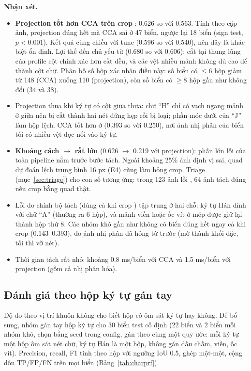 \textbf{Nhận xét.}
\begin{itemize}
  \item \textbf{Projection tốt hơn CCA trên crop }: 0.626 so với 0.563. Tính theo cặp ảnh, projection đúng hết mà CCA sai ở 47 biển, ngược lại 18 biển (sign test, $p<0.001$). Kết quả cùng chiều với tune (0.596 so với 0.540), nên đây là khác biệt ổn định. Lợi thế đến chủ yếu từ  (0.680 so với 0.606): cắt tại thung lũng của profile cột chính xác hơn cắt đều, và các vệt nhiễu mảnh không đủ cao để thành cột chữ. Phân bố số hộp xác nhận điều này: số biển có $\le 6$ hộp giảm từ 148 (CCA) xuống 110 (projection), còn số biển có $\ge 8$ hộp gần như không đổi (34 và 38).
  \item Projection thua khi ký tự có cột giữa thưa: chữ ``H'' chỉ có vạch ngang mảnh ở giữa nên bị cắt thành hai nét đứng hẹp rồi bị loại; phần móc dưới của ``J'' làm hộp lệch. CCA tốt hơn ở  (0.393 so với 0.250), nơi ảnh nhị phân của biển tối có nhiều vệt dọc nối vào ký tự.
  \item \textbf{Khoảng cách  $\to$  rất lớn} (0.626 $\to$ 0.219 với projection): phần lớn lỗi của toàn pipeline nằm trước bước tách. Ngoài khoảng 25\% ảnh định vị sai, quad dự đoán lệch trung bình 16 px (E4) cũng làm hỏng crop. Triage (mục~\ref{sec:triage}) cho con số tương ứng: trong 123 ảnh lỗi , 64 ảnh tách đúng nếu crop bằng quad thật.
  \item Lỗi do chính bộ tách (đúng cả khi crop ) tập trung ở hai chỗ: ký tự Hán dính với chữ ``A'' (thường ra 6 hộp), và mảnh viền hoặc ốc vít ở mép được giữ lại thành hộp thứ 8. Các nhóm khó gần như không có biển đúng hết ngay cả khi crop  (0.143--0.393), do ảnh nhị phân đã hỏng từ trước (mờ thành khối đặc, tối thì vỡ nét).
  \item Thời gian tách rất nhỏ: khoảng 0.8 ms/biển với CCA và 1.5 ms/biển với projection (gồm cả nhị phân hóa).
\end{itemize}

\subsection{Đánh giá theo hộp ký tự gán tay}
\label{sec:charbox}

Độ đo theo vị trí khuôn không cho biết hộp có ôm sát ký tự hay không. Để bổ sung, nhóm gán tay hộp ký tự cho 30 biển test cố định (22 biển  và 2 biển mỗi nhóm khó, chọn bằng seed trong config, gán theo cùng một quy ước: mỗi ký tự một hộp ôm sát nét chữ, ký tự Hán là một hộp, không gán dấu chấm, viền, ốc vít). Precision, recall, F1 tính theo hộp với ngưỡng IoU 0.5, ghép một-một, cộng dồn TP/FP/FN trên mọi biển (Bảng~\ref{tab:charprf}).

